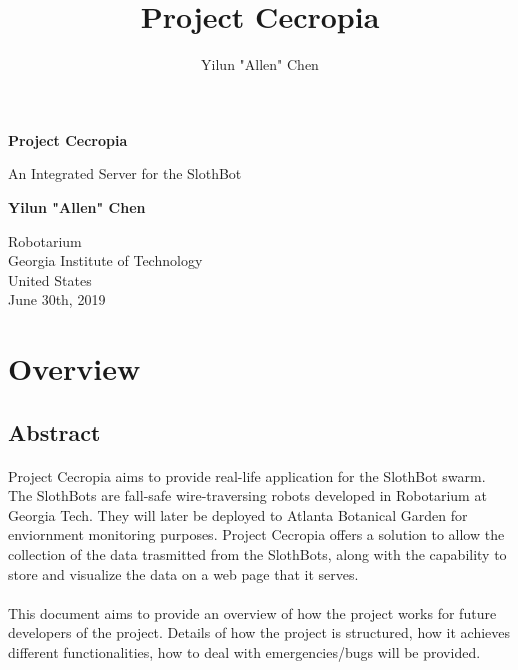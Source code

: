 \documentclass{article}
\begin{document}
	\title{Project Cecropia}
	\author{Yilun "Allen" Chen}
  	\newpage
\begin{titlepage}
  \begin{center}
      \vspace*{8cm}

      \textbf{Project Cecropia}

      \vspace{0.5cm}
       An Integrated Server for the SlothBot 

      \vspace{1.5cm}

      \textbf{Yilun "Allen" Chen}

      \vfill


      Robotarium\\
      Georgia Institute of Technology\\
      United States\\
      June 30th, 2019

  \end{center}
\end{titlepage}


\section{Overview}
\subsection{Abstract}
\paragraph{} Project Cecropia aims to provide real-life application for the SlothBot swarm. The SlothBots are fall-safe
wire-traversing robots developed in Robotarium at Georgia Tech. They will later be deployed to Atlanta Botanical Garden for enviornment monitoring
purposes. Project Cecropia offers a solution to allow the collection of the data trasmitted from the SlothBots, along with the capability to store
and visualize the data on a web page that it serves.
\paragraph{}This document aims to provide an overview of how the project works for future developers of the project. Details of how the project is structured, 
how it achieves different functionalities, how to deal with emergencies/bugs will be provided.
\end{document}
